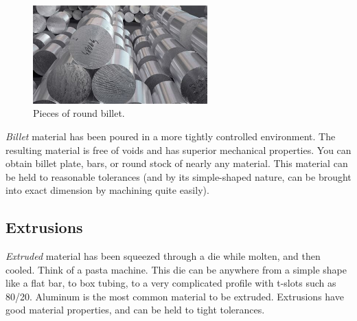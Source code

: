  \begin{figure}[H]
	\includegraphics[width=0.6\textwidth]{imgs/billet.jpeg}
	\caption{Pieces of round billet.}
\end{figure} 
 \textit{Billet} material has been poured in a more tightly controlled environment. The resulting material is free of voids and has superior mechanical properties. You can obtain billet plate, bars, or round stock of nearly any material. This material can be held to reasonable tolerances (and by its simple-shaped nature, can be brought into exact dimension by machining quite easily).
 
 \subsection{Extrusions} \label{subsec:extrusions}
 \textit{Extruded} material has been squeezed through a die while molten, and then cooled. Think of a pasta machine. This die can be anywhere from a simple shape like a flat bar, to box tubing, to a very complicated profile with t-slots such as 80/20. Aluminum is the most common material to be extruded. Extrusions have good material properties, and can be held to tight tolerances.
 
